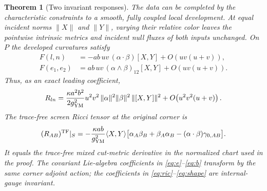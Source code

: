 \documentclass[11pt]{article}
\newtheorem{theorem}{Theorem}
\newcommand{\TF}{\mathrm{TF}}
\begin{document}
\begin{theorem}[Two invariant responses]\label{thm:response}
The data can be completed by the characteristic constraints to a smooth, fully coupled local development. At equal incident norms \(\|X\|\) and \(\|Y\|\), varying their relative color leaves the pointwise intrinsic metrics and incident null fluxes of both inputs unchanged. On \(P\) the developed curvatures satisfy
\begin{align}
 F(l,n)&=-ab\,uv\,(\alpha\cdot\beta)[X,Y]+O\!\left(uv(u+v)\right),\label{eq:e}\\
 F(e_1,e_2)&=ab\,uv\,(\alpha\wedge\beta)_{12}[X,Y]+O\!\left(uv(u+v)\right).\label{eq:b}
\end{align}
Thus, as an exact leading coefficient,
\begin{equation}
 R_{ln}=\frac{\kappa a^2 b^2}{2g_{\rm YM}^2}
     u^2v^2\,\|\alpha\|^2\|\beta\|^2\,\|[X,Y]\|^2
     +O\!\left(u^2v^2(u+v)\right).
 \label{eq:ric}
\end{equation}
The trace-free screen Ricci tensor at the original corner is
\begin{equation}
 (R_{AB})^\TF|_S
 =-\frac{\kappa ab}{g_{\rm YM}^2}\langle X,Y\rangle
       \bigl[\alpha_A\beta_B+\beta_A\alpha_B-(\alpha\cdot\beta)\gamma_{0,AB}\bigr].
 \label{eq:shape}
\end{equation}
It equals the trace-free mixed cut-metric derivative in the normalized chart used in the proof. The covariant Lie-algebra coefficients in \eqref{eq:e}--\eqref{eq:b} transform by the same corner adjoint action; the coefficients in \eqref{eq:ric}--\eqref{eq:shape} are internal-gauge invariant.
\end{theorem}
\end{document}
